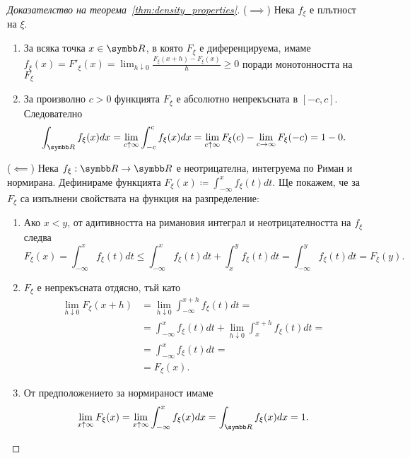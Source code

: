 \documentclass[numbers=endperiod, bibliography=totocnumbered]{scrartcl}
\begin{document}
\begin{proof}[Доказателство на теорема~\ref{thm:density_properties}]
  (\( \implies \)) Нека \( f_\xi \) е плътност на \( \xi \).
  \begin{enumerate}
    \item За всяка точка \( x \in \R \), в която \( F_\xi \) е диференцируема, имаме \( f_\xi(x) = F'_\xi(x) = \lim_{h \downarrow 0} \frac {F_\xi(x + h) - F_\xi(x)} h \geq 0 \) поради монотонността на \( F_\xi \)
    \item За произволно \( c > 0 \) функцията \( F_\xi \) е абсолютно непрекъсната в \( [-c, c] \). Следователно
    \begin{equation*}
      \int_{\R} f_\xi(x) dx
      =
      \lim_{c \uparrow \infty} \int_{-c}^c f_\xi(x) dx
      =
      \lim_{c \uparrow \infty} F_\xi(c) - \lim_{c \to \infty} F_\xi(-c)
      =
      1 - 0.
    \end{equation*}
  \end{enumerate}

  (\( \impliedby \)) Нека \( f_\xi: \R \to \R \) е неотрицателна, интегруема по Риман и нормирана. Дефинираме функцията \( F_\xi(x) \coloneqq \int_{-\infty}^x f_\xi(t) dt \). Ще покажем, че за \( F_\xi \) са изпълнени свойствата на функция на разпределение:
  \begin{enumerate}
    \item Ако \( x < y \), от адитивността на римановия интеграл и неотрицателността на \( f_\xi \) следва
    \begin{equation*}
      F_\xi(x)
      =
      \int_{-\infty}^x f_\xi(t) dt
      \leq
      \int_{-\infty}^x f_\xi(t) dt + \int_x^y f_\xi(t) dt
      =
      \int_{-\infty}^y f_\xi(t) dt
      =
      F_\xi(y).
    \end{equation*}

    \item \( F_\xi \) е непрекъсната отдясно, тъй като
    \begin{align*}
      \lim_{h \downarrow 0} F_\xi(x + h)
      &=
      \lim_{h \downarrow 0} \int_{-\infty}^{x + h} f_\xi(t) dt
      = \\ &=
      \int_{-\infty}^x f_\xi(t) dt + \lim_{h \downarrow 0} \int_x^{x + h} f_\xi(t) dt
      = \\ &=
      \int_{-\infty}^x f_\xi(t) dt
      = \\ &=
      F_\xi(x).
    \end{align*}

    \item От предположението за нормираност имаме
    \begin{equation*}
      \lim_{x \uparrow \infty} F_\xi(x)
      =
      \lim_{x \uparrow \infty} \int_{-\infty}^x f_\xi(x) dx
      =
      \int_{\R} f_\xi(x) dx = 1.
    \end{equation*}


\end{enumerate}
\end{proof}
\end{document}
